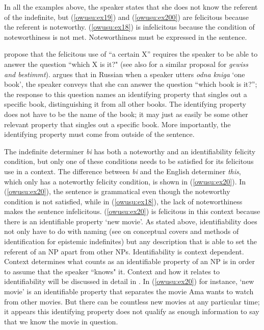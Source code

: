 \documentclass[output=paper,modfonts,nonflat,draftmode]{langsci/langscibook}
\begin{document}
\z
\z

In all the examples above, the speaker states that she does not know the referent of the indefinite, but (\ref{owusu:ex19}) and (\ref{owusu:ex200}) are felicitous because the referent is noteworthy. (\ref{owusu:ex18}) is infelicitous because the condition of noteworthiness is not met. Noteworthiness must be expressed in the sentence.

\citet{AbuschRooth1997} propose that the felicitous use of  ``a certain X” requires the speaker to be able to answer the question ``which X is it?" (see also \citet{EbertEtAl2013} for a similar proposal for \emph{gewiss and bestimmt}). \citet{Aloni2001} argues that in Russian when a  speaker utters \emph{odna kniga} `one book', the speaker conveys that she can answer the question ``which book is it?”; the response to this question names an identifying property that singles out a specific book, distinguishing it from all other books. The identifying property does not have to be the name of the book; it may just as easily be some other relevant property that singles out a specific book. More importantly, the identifying property must come from outside of the sentence.


The indefinite determiner \emph{bi} has both a noteworthy and an identifiability felicity condition, but only one of these conditions needs to be satisfied for its felicitous use in a context. The difference between \emph{bi} and the English determiner \emph{this}, which only has a noteworthy felicity condition, is shown in (\ref{owusu:ex20}). In (\ref{owusu:ex20}), the sentence is grammatical even though the noteworthy condition is not satisfied, while in (\ref{owusu:ex18}), the lack of noteworthiness makes the sentence infelicitous. (\ref{owusu:ex20}) is felicitous in this context because there is an identifiable property `new movie'. As stated above, identifiability does not only have to do with naming (see \citet{AloniPort2015} on conceptual covers and methods of identification for epistemic indefinites) but any description that is able to set the referent of an NP apart from other NPs. Identifiability is context dependent. Context determines what counts as an identifiable property of an NP is in order to assume that the speaker ``knows" it. Context and how it relates to identifiability will be discussed in detail in . In (\ref{owusu:ex20}) for instance, `new movie' is an identifiable property that separates the movie Ama wants to watch from other movies.  But there can be countless new movies at any particular time; it appears this identifying property does not qualify as enough information to say that we know the movie in question. 
\end{document}
